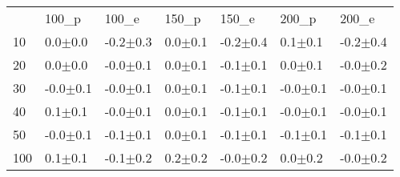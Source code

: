 \begin{tabular}{lllllll}
 & 100_p & 100_e & 150_p & 150_e & 200_p & 200_e \\
10 & {\cellcolor[HTML]{B0B0B0}} \color[HTML]{000000} 0.0$\pm$0.0 & {\cellcolor[HTML]{DBDBDB}} \color[HTML]{000000} -0.2$\pm$0.3 & {\cellcolor[HTML]{D2D2D2}} \color[HTML]{000000} 0.0$\pm$0.1 & {\cellcolor[HTML]{D8D8D8}} \color[HTML]{000000} -0.2$\pm$0.4 & {\cellcolor[HTML]{F6F6F6}} \color[HTML]{000000} 0.1$\pm$0.1 & {\cellcolor[HTML]{CFCFCF}} \color[HTML]{000000} -0.2$\pm$0.4 \\
20 & {\cellcolor[HTML]{FFFFFF}} \color[HTML]{000000} 0.0$\pm$0.0 & {\cellcolor[HTML]{C5C5C5}} \color[HTML]{000000} -0.0$\pm$0.1 & {\cellcolor[HTML]{9A9A9A}} \color[HTML]{F1F1F1} 0.0$\pm$0.1 & {\cellcolor[HTML]{EEEEEE}} \color[HTML]{000000} -0.1$\pm$0.1 & {\cellcolor[HTML]{D8D8D8}} \color[HTML]{000000} 0.0$\pm$0.1 & {\cellcolor[HTML]{A8A8A8}} \color[HTML]{F1F1F1} -0.0$\pm$0.2 \\
30 & {\cellcolor[HTML]{A4A4A4}} \color[HTML]{F1F1F1} -0.0$\pm$0.1 & {\cellcolor[HTML]{A8A8A8}} \color[HTML]{F1F1F1} -0.0$\pm$0.1 & {\cellcolor[HTML]{D4D4D4}} \color[HTML]{000000} 0.0$\pm$0.1 & {\cellcolor[HTML]{D6D6D6}} \color[HTML]{000000} -0.1$\pm$0.1 & {\cellcolor[HTML]{D4D4D4}} \color[HTML]{000000} -0.0$\pm$0.1 & {\cellcolor[HTML]{B0B0B0}} \color[HTML]{000000} -0.0$\pm$0.1 \\
40 & {\cellcolor[HTML]{DEDEDE}} \color[HTML]{000000} 0.1$\pm$0.1 & {\cellcolor[HTML]{979797}} \color[HTML]{F1F1F1} -0.0$\pm$0.1 & {\cellcolor[HTML]{B5B5B5}} \color[HTML]{000000} 0.0$\pm$0.1 & {\cellcolor[HTML]{D9D9D9}} \color[HTML]{000000} -0.1$\pm$0.1 & {\cellcolor[HTML]{ABABAB}} \color[HTML]{000000} -0.0$\pm$0.1 & {\cellcolor[HTML]{A8A8A8}} \color[HTML]{F1F1F1} -0.0$\pm$0.1 \\
50 & {\cellcolor[HTML]{C8C8C8}} \color[HTML]{000000} -0.0$\pm$0.1 & {\cellcolor[HTML]{CCCCCC}} \color[HTML]{000000} -0.1$\pm$0.1 & {\cellcolor[HTML]{A9A9A9}} \color[HTML]{F1F1F1} 0.0$\pm$0.1 & {\cellcolor[HTML]{E0E0E0}} \color[HTML]{000000} -0.1$\pm$0.1 & {\cellcolor[HTML]{DCDCDC}} \color[HTML]{000000} -0.1$\pm$0.1 & {\cellcolor[HTML]{E1E1E1}} \color[HTML]{000000} -0.1$\pm$0.1 \\
100 & {\cellcolor[HTML]{EDEDED}} \color[HTML]{000000} 0.1$\pm$0.1 & {\cellcolor[HTML]{C5C5C5}} \color[HTML]{000000} -0.1$\pm$0.2 & {\cellcolor[HTML]{E9E9E9}} \color[HTML]{000000} 0.2$\pm$0.2 & {\cellcolor[HTML]{999999}} \color[HTML]{F1F1F1} -0.0$\pm$0.2 & {\cellcolor[HTML]{A2A2A2}} \color[HTML]{F1F1F1} 0.0$\pm$0.2 & {\cellcolor[HTML]{979797}} \color[HTML]{F1F1F1} -0.0$\pm$0.2 \\

\end{tabular}
